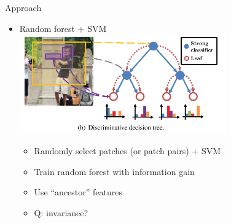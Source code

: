 \documentclass[12pt]{beamer}
\begin{document}
\begin{frame}{Approach}
    \begin{itemize}
        \item Random forest + SVM \\
        \medskip
        { \includegraphics[width=0.7\textwidth]{fffig3.png} }
        \begin{itemize}
            \item Randomly select patches (or patch pairs) + SVM
            \item Train random forest with information gain
            \item Use ``ancestor'' features
            \item Q: invariance?
        \end{itemize}
    \end{itemize}
\end{frame}
\end{document}
